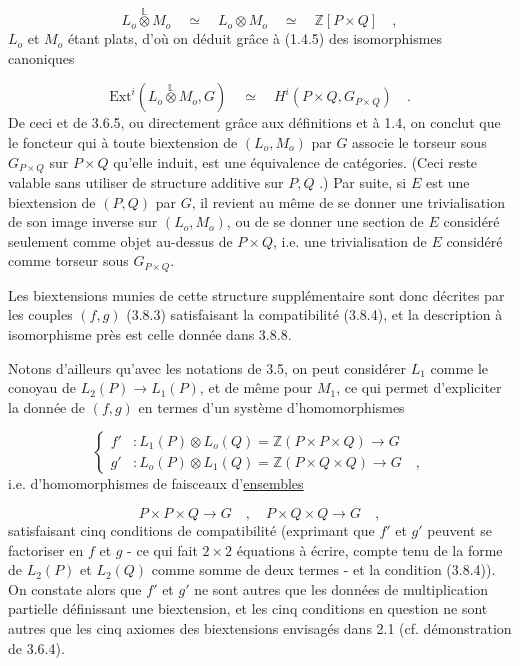 \begin{equation*}
L_o \overset{\mathbb{L}}{\otimes} M_o \quad \simeq \quad L_o \otimes M_o \quad \simeq \quad \mathbb{Z}[P\times Q] \quad ,
\end{equation*}
$L_o$ et $M_o$ étant plats, d'où on déduit grâce à (1.4.5) des isomorphismes canoniques

\begin{equation*}
\mathrm{Ext}^i(L_o \overset{\mathbb{L}}{\otimes} M_o, G) \quad \simeq \quad H^i(P\times Q, G_{P\times Q}) \quad .
\end{equation*}
De ceci et de 3.6.5, ou directement grâce aux définitions et à 1.4, on conclut que le foncteur qui à toute biextension de $(L_o,M_o)$ par $G$ associe le torseur sous $G_{P\times Q}$ sur $P\times Q$ qu'elle induit, est une équivalence de catégories. (Ceci reste valable sans utiliser de structure additive sur $P,Q$ .) Par suite, si $E$ est une biextension de $(P,Q)$ par $G$, il revient au même de se donner une trivialisation de son image inverse sur $(L_o,M_o)$, ou de se donner une section de $E$ considéré seulement comme objet au-dessus de $P\times Q$, i.e. une trivialisation de $E$ considéré comme torseur sous $G_{P\times Q}$.



Les biextensions munies de cette structure supplémentaire sont donc décrites par les couples $(f,g)$ (3.8.3) satisfaisant la compatibilité (3.8.4), et la description à isomorphisme près est celle donnée dans 3.8.8.

Notons d'ailleurs qu'avec les notations de 3.5, on peut considérer $L_1$ comme le conoyau de $L_2(P) \longrightarrow L_1(P)$, et de même pour $M_1$, ce qui permet d'expliciter la donnée de $(f,g)$ en termes d'un système d'homomorphismes

\begin{equation*}
\left\{
\begin{aligned}
f' &: L_1(P) \otimes L_o(Q) = \mathbb{Z}(P\times P\times Q) \longrightarrow G\\
g' &: L_o(P) \otimes L_1(Q) = \mathbb{Z}(P\times Q\times Q) \longrightarrow G \quad ,
\end{aligned}
\right.
\end{equation*}
i.e. d'homomorphismes de faisceaux d'\underline{ensembles}

\begin{equation*}
P\times P\times Q \longrightarrow G \quad , \quad P\times Q\times Q \longrightarrow G \quad ,
\end{equation*}
satisfaisant cinq conditions de compatibilité (exprimant que $f'$ et $g'$ peuvent se factoriser en $f$ et $g$ - ce qui fait $2\times 2$ équations à écrire, compte tenu de la forme de $L_2(P)$ et $L_2(Q)$ comme somme de deux termes - et la condition (3.8.4)). On constate alors que $f'$ et $g'$ ne sont autres que les données de multiplication partielle définissant une biextension, et les cinq conditions en question ne sont autres que les cinq axiomes des biextensions envisagés dans 2.1 (cf. démonstration de 3.6.4).




